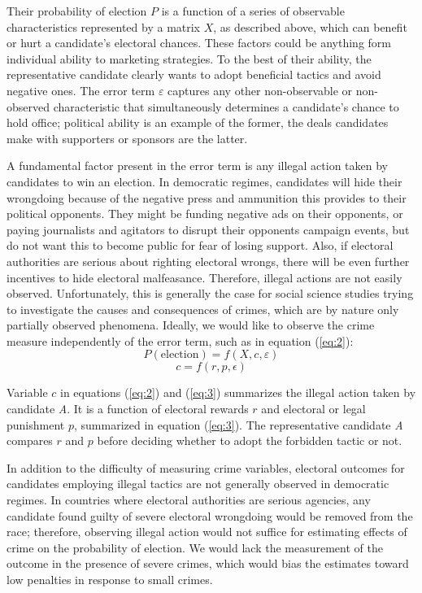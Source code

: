 \documentclass[11pt]{article}
\newcommand{\refp}[1]{(\ref{#1})}
\begin{document}
Their probability of election $P$ is a function of a series of observable characteristics represented by a matrix $X$, as described above, which can benefit or hurt a candidate's electoral chances. These factors could be anything form individual ability to marketing strategies. To the best of their ability, the representative candidate clearly wants to adopt beneficial tactics and avoid negative ones. The error term $\varepsilon$ captures any other non-observable or non-observed characteristic that simultaneously determines a candidate's chance to hold office; political ability is an example of the former, the deals candidates make with supporters or sponsors are the latter.

A fundamental factor present in the error term is any illegal action taken by candidates to win an election. In democratic regimes, candidates will hide their wrongdoing because of the negative press and ammunition this provides to their political opponents. They might be funding negative ads on their opponents, or paying journalists and agitators to disrupt their opponents campaign events, but do not want this to become public for fear of losing support. Also, if electoral authorities are serious about righting electoral wrongs, there will be even further incentives to hide electoral malfeasance. Therefore, illegal actions are not easily observed. Unfortunately, this is generally the case for social science studies trying to investigate the causes and consequences of crimes, which are by nature only partially observed phenomena. Ideally, we would like to observe the crime measure independently of the error term, such as in equation \refp{eq:2}:
\begin{equation} \label{eq:2}
  P(\text{election}) = f(X, c, \varepsilon)
\end{equation}
\begin{equation} \label{eq:3}
  c = f(r, p, \epsilon)
\end{equation}

Variable $c$ in equations \refp{eq:2} and \refp{eq:3} summarizes the illegal action taken by candidate \emph{A}. It is a function of electoral rewards $r$ and electoral or legal punishment $p$, summarized in equation \refp{eq:3}. The representative candidate \emph{A} compares $r$ and $p$ before deciding whether to adopt the forbidden tactic or not.

In addition to the difficulty of measuring crime variables, electoral outcomes for candidates employing illegal tactics are not generally observed in democratic regimes. In countries where electoral authorities are serious agencies, any candidate found guilty of severe electoral wrongdoing would be removed from the race; therefore, observing illegal action would not suffice for estimating effects of crime on the probability of election. We would lack the measurement of the outcome in the presence of severe crimes, which would bias the estimates toward low penalties in response to small crimes.
\end{document}
